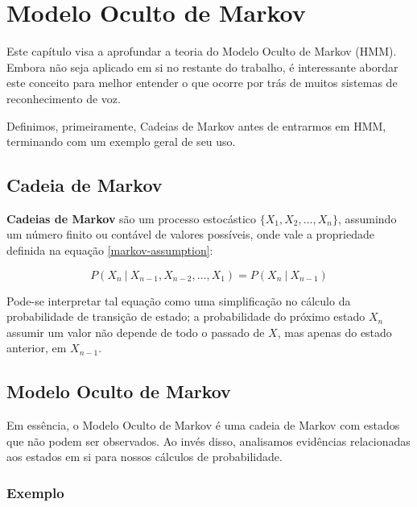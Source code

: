 \chapter{Modelo Oculto de Markov}
\label{cap:hmm}

Este capítulo visa a aprofundar a teoria do Modelo Oculto de Markov (HMM). Embora não seja aplicado em si no restante do trabalho, é interessante abordar este conceito para melhor entender o que ocorre por trás de muitos sistemas de reconhecimento de voz.

Definimos, primeiramente, Cadeias de Markov antes de entrarmos em HMM, terminando com um exemplo geral de seu uso.


\section{Cadeia de Markov}

\textbf{Cadeias de Markov} são um processo estocástico $\{X_1, X_2, \ldots, X_n\}$, assumindo um número finito ou contável de valores possíveis, onde vale a propriedade definida na equação \ref{markov-assumption}:

\begin{equation}
\label{markov-assumption}
P(X_n\:|\:X_{n-1}, X_{n-2}, \dots, X_1) = P(X_n\:|\:X_{n-1})
\end{equation}

Pode-se interpretar tal equação como uma simplificação no cálculo da probabilidade de transição de estado; a probabilidade do próximo estado $X_n$ assumir um valor não depende de todo o passado de $X$, mas apenas do estado anterior, em $X_{n-1}$.


\section{Modelo Oculto de Markov}

Em essência, o Modelo Oculto de Markov é uma cadeia de Markov com estados que não podem ser observados. Ao invés disso, analisamos evidências relacionadas aos estados em si para nossos cálculos de probabilidade.


\subsection{Exemplo}


